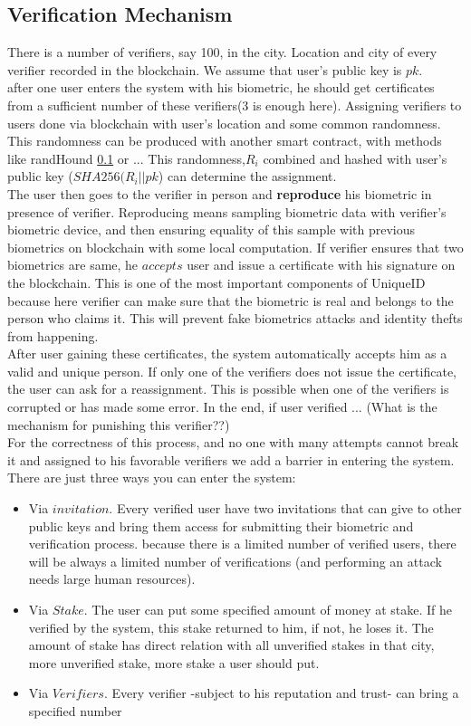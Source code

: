 \documentclass[conference]{IEEEtran}
\begin{document}
\subsection{Verification Mechanism}
There is a number of verifiers, say 100, in the city. Location and city of every verifier recorded in the blockchain. We assume that user's public key is $pk$.
\\

 after one user enters the system with his biometric, he should get certificates from a sufficient number of these verifiers(3 is enough here). Assigning verifiers to users done via blockchain with user's location and some common randomness. This randomness can be produced with another smart contract, with methods like randHound \ref{} or ...   This randomness,$ R_i$ combined and hashed with user's public key ($SHA256(R_i || pk$) can determine the assignment. \\ 
The user then goes to the verifier in person and \textbf{reproduce}  his biometric in presence of verifier. Reproducing means sampling biometric data with verifier's biometric device, and then ensuring equality of this sample with previous biometrics on blockchain with some local computation. If verifier ensures that two biometrics are same, he $accepts$ user and issue a certificate with his signature on the blockchain. This is one of the most important components of UniqueID because here verifier can make sure that the biometric is real and belongs to the person who claims it. This will prevent fake biometrics attacks and identity thefts from happening.
\\
After user gaining these certificates, the system automatically accepts him as a valid and unique person. If only one of the verifiers does not issue the certificate, the user can ask for a reassignment. This is possible when one of the verifiers is corrupted or has made some error. In the end, if user verified ... (What is the mechanism for punishing this verifier??)
\\
For the correctness of this process, and no one with many attempts cannot break it and assigned to his favorable verifiers we add a barrier in entering the system. There are just three ways you can enter the system:
\begin{itemize}
\item Via $invitation$. Every verified user have two invitations that can give to other public keys and bring them access for submitting their biometric and verification process. because there is a limited number of verified users, there will be always a limited number of verifications (and performing an attack needs large human resources).

\item Via $Stake$. The user can put some specified amount of money at stake. If he verified by the system, this stake returned to him, if not, he loses it. The amount of stake has direct relation with all unverified stakes in that city, more unverified stake, more stake a user should put.

\item Via $Verifiers$. Every verifier -subject to his reputation and trust- can bring a specified number  
\end{itemize}
\end{document}
